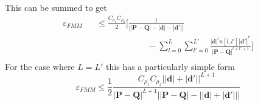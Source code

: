 \documentclass[prb,aps,nobibnotes,twocolumn,doublespace,twocolumngrid,superbib]{revtex4}
\begin{document}
This can be summed to get
%
\begin{eqnarray}
\varepsilon_{FMM} && \leq 
{\frac{C_{\rho_1} C_{\rho_2}}{2}} \bigg[ 
\frac{1}{\left|\left|\mathbf{P}-\mathbf{Q}\right|-\left| \mathbf{d} \right|-\left| \mathbf{d'} 
\right| \right|} \nonumber\\
&&\qquad\qquad\qquad-\sum _{l=0}^{L}\sum_{l'=0}^{L'}
{\frac{\left| \mathbf{d} \right|^{l} n[l,l'] \left| \mathbf{d'} \right|^{l'}}
{\left|\mathbf{P}-\mathbf{Q}\right| ^{l+l'+1}}} \bigg] \nonumber\\
\label{B43}
\end{eqnarray}
%
For the case where $L=L'$ this has a particularly simple form
\begin{equation}
\varepsilon_{FMM}  \leq \frac{1}{2}
\frac{ C_{\rho_1} C_{\rho_2} \left| |\mathbf{d}|+|\mathbf{d'}| \right|^{L+1}}
{\left|\mathbf{P}-\mathbf{Q}\right|^{L+1}
\left|\left|\mathbf{P}-\mathbf{Q}\right|-\left||\mathbf{d}|+|\mathbf{d'}|  \right|\right|}
\label{B44}
\end{equation}
\eject
\end{document}
